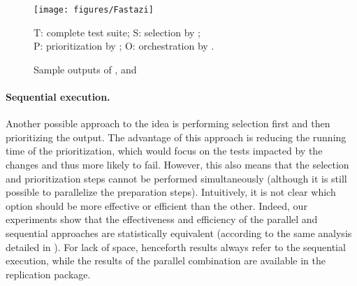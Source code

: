 \begin{figure}[t]
  \centering
    \texttt{[image: figures/Fastazi]}
    \begin{center}
  	\footnotesize
  	T: complete test suite; S: selection by \ek;\\ P: prioritization by \fs; O: orchestration by \fz. 
	\end{center}

    \caption{Sample outputs of \ek, \fs and \fz}
    \label{fig:fastazi}
\end{figure}





\paragraph{Sequential execution.}
Another possible approach to the idea is performing selection first and then prioritizing the output.
The advantage of this approach is reducing the running time of the prioritization, which would focus on the tests impacted by the changes and thus more likely to fail.
However, this also means that the selection and prioritization steps cannot be performed simultaneously (although it is still possible to parallelize the preparation steps).
Intuitively, it is not clear which option should be more effective or efficient than the other.
Indeed, our experiments show that the effectiveness and efficiency of the parallel and sequential approaches are statistically equivalent (according to the same analysis detailed in ).
For lack of space, henceforth \fz results always refer to the sequential execution, while the results of the parallel combination are available in the replication package.

